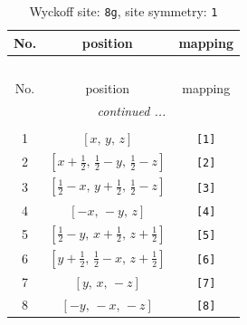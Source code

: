 \documentclass[fleqn,8pt]{jsarticle}
\begin{document}
\renewcommand{\arraystretch}{1.2}
\begin{longtable}{ccc}
\caption{Wyckoff site: {\tt 8g}, site symmetry: {\tt 1}}
 \\
 \hline \hline
No. & position & mapping \\ \hline \endfirsthead

\multicolumn{2}{l}{\tablename\ \thetable{}} \\
 \hline \hline
No. & position & mapping \\ \hline \endhead

 \hline \hline
\multicolumn{2}{r}{\footnotesize\it continued ...} \\ \endfoot

 \hline \hline
\multicolumn{2}{r}{} \\ \endlastfoot

1 & $\left[ x,\, y,\, z \right]$ & {\tt [1]} \\ \hline
2 & $\left[ x + \frac{1}{2},\, \frac{1}{2} - y,\, \frac{1}{2} - z \right]$ & {\tt [2]} \\ \hline
3 & $\left[ \frac{1}{2} - x,\, y + \frac{1}{2},\, \frac{1}{2} - z \right]$ & {\tt [3]} \\ \hline
4 & $\left[ - x,\, - y,\, z \right]$ & {\tt [4]} \\ \hline
5 & $\left[ \frac{1}{2} - y,\, x + \frac{1}{2},\, z + \frac{1}{2} \right]$ & {\tt [5]} \\ \hline
6 & $\left[ y + \frac{1}{2},\, \frac{1}{2} - x,\, z + \frac{1}{2} \right]$ & {\tt [6]} \\ \hline
7 & $\left[ y,\, x,\, - z \right]$ & {\tt [7]} \\ \hline
8 & $\left[ - y,\, - x,\, - z \right]$ & {\tt [8]} \\
\end{longtable}
\end{document}
